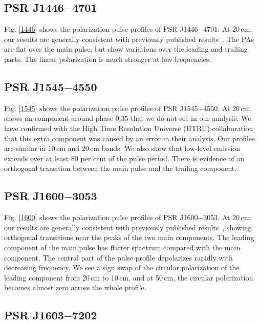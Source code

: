\documentclass[useAMS,usenatbib]{mn2e}
\begin{document}
\begin{appendix}
\subsection{PSR J1446$-$4701}

Fig. \ref{1446} shows the polarization pulse profiles of 
PSR J1446$-$4701.
%
At 20\,cm, our results are generally consistent with previously published
results~\citep{Keith12}.
%
The PAs are flat over the main pulse, but show variations over the leading and 
trailing parts.
%
The linear polarization is much stronger at low frequencies.

\subsection{PSR J1545$-$4550}

Fig. \ref{1545} shows the polarization pulse profiles of 
PSR J1545$-$4550.
%
At 20\,cm, \citet{Burgay13} shows an component around phase $0.35$ that 
we do not see in our analysis. We have confirmed with the High Time Resolution 
Universe (HTRU) collaboration that this extra component was caused by an error 
in their analysis.  
%
Our profiles are similar in 10\,cm and 20\,cm bands.
%
We also show that low-level emission extends over at least $80$ 
per cent of the pulse period.
%
There is evidence of an orthogonal transition between the main pulse and 
the trailing component.

\subsection{PSR J1600$-$3053}

Fig. \ref{1600} shows the polarization pulse profiles of 
PSR J1600$-$3053.
%
At 20\,cm, our results are generally consistent with previously published
results~\citep{Ord04,Yan11}, showing orthogonal transitions near the 
peaks of the two main components.
%
The leading component of the main pulse has flatter spactrum compared with 
the main component.
%
The central part of the pulse profile depolarizes rapidly with decreasing 
frequency. 
%
We see a sign swap of the circular polarization of the leading component 
from 20\,cm to 10\,cm, and at 50\,cm, the circular polarization becomes almost 
zero across the whole profile.


\subsection{PSR J1603$-$7202}


\end{appendix}
\end{document}
